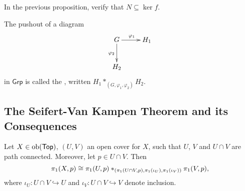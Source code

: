 \begin{exercise}
	In the previous proposition, verify that $N \subseteq \ker f$.
\end{exercise}

\begin{definition}
	The pushout of a diagram
		\begin{equation*}
		\xymatrix{
			G \ar[r]^{\varphi_1}\ar[d]_{\varphi_2} & H_1\\
			H_2
		}
	\end{equation*}
	\noindent in $\mathsf{Grp}$ is called the , written $H_1 \ast_{(G,\varphi_1,\varphi_2)} H_2$.
\end{definition}

\subsection*{The Seifert-Van Kampen Theorem and its Consequences}

\begin{theorem}
	Let $X \in \operatorname{ob}(\mathsf{Top})$, $(U,V)$ an open cover for $X$, such that $U$, $V$ and $U \cap V$ are path connected. Moreover, let $p \in U \cap V$. Then
	\begin{equation}
		\pi_1(X,p) \cong \pi_1(U,p) \ast_{\del[0]{\pi_1(U \cap V,p),\pi_1(\iota_U),\pi_1(\iota_V)}} \pi_1(V,p),
	\end{equation}
	\noindent where $\iota_U : U \cap V \hookrightarrow U$ and $\iota_V : U \cap V \hookrightarrow V$ denote inclusion.
	\label{thm:seifert-van_kampen}
\end{theorem}

